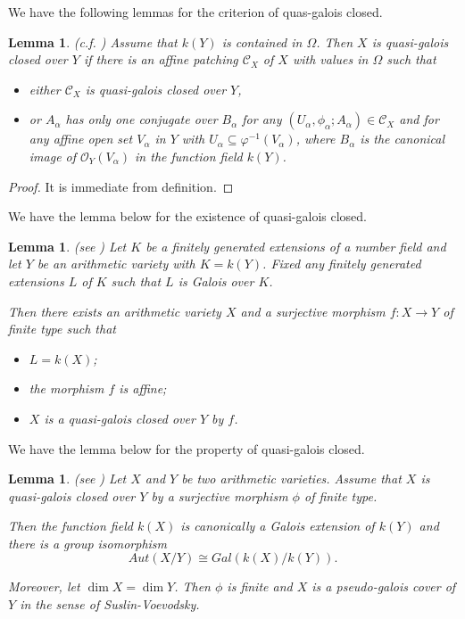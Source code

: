 \documentclass[12pt,twoside,reqno]{amsart}
\newtheorem{lemma}[theorem]{Lemma}
\theoremstyle{definition}
\numberwithin{equation}{section}
\begin{document}
We have the following lemmas for the criterion of quas-galois closed.

\begin{lemma}
\emph{(c.f. \cite{An3})} Assume that $k(Y)$ is contained in $\Omega $. Then $X$ is quasi-galois closed over $Y$ if there is an affine patching $\mathcal{C}_{X}$ of $X$ with values in $\Omega $ such that

\begin{itemize}
\item either $\mathcal{C}_{X}$ is quasi-galois closed over $Y$,

\item or $A_{\alpha }$ has only one conjugate over $B_{\alpha}$ for any $(U_{\alpha },\phi _{\alpha };A_{\alpha })\in \mathcal{C}_{X}$ and for any
affine open set $V_{\alpha}$ in $Y$ with $U_{\alpha }\subseteq
\varphi^{-1}(V_{\alpha})$, where $B_{\alpha}$ is the canonical image of $\mathcal{O}_{ Y}(V_{\alpha})$ in the function field $k(Y)$.
\end{itemize}
\end{lemma}

\begin{proof}
It is immediate from definition.
\end{proof}

We have the lemma below for the existence of quasi-galois closed.

\begin{lemma}
\emph{(see \cite{An3})} Let $K$ be a finitely generated extensions of a
number field and let $Y$ be an arithmetic variety with $K=k\left( Y\right) $. Fixed any finitely generated extensions $L$ of $K$ such that $L$ is Galois
over $K$.

Then there exists an arithmetic variety $X$ and a surjective morphism $f:X\rightarrow Y$ of finite type such that

\begin{itemize}
\item $L=k\left( X\right) $;

\item the morphism $f$ is affine;

\item $X$ is a quasi-galois closed over $Y$ by $f$.
\end{itemize}
\end{lemma}

We have the lemma below for the property of quasi-galois closed.

\begin{lemma}
\emph{(see \cite{An2})} Let $X$ and $Y$ be two arithmetic varieties. Assume
that $X$ is quasi-galois closed over $Y$ by a surjective morphism $\phi$ of
finite type.

Then the function field $k\left( X\right) $ is canonically a Galois
extension of $k(Y)$ and there is a group isomorphism
\begin{equation*}
{Aut}\left( X/Y\right) \cong Gal(k\left( X\right) /k(Y)).
\end{equation*}

Moreover, let $\dim X=\dim Y$. Then $\phi$ is finite and $X$ is a
pseudo-galois cover of $Y$ in the sense of Suslin-Voevodsky.
\end{lemma}
\end{document}
